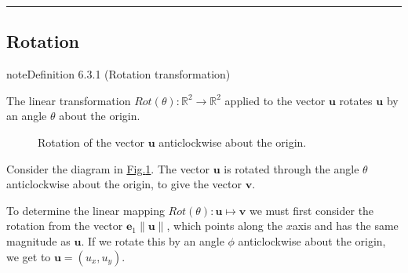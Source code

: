 \documentclass[letterpaper,10pt,english]{jupyterBook}
\let\sphinxpxdimen\pdfpxdimen\else\newdimen\sphinxpxdimen
\begin{document}
\bigskip\hrule\bigskip


\ignorespaces 

\subsection{Rotation}
\label{\detokenize{_pages/6.3_Rotation_reflection_and_translation:rotation}}\label{\detokenize{_pages/6.3_Rotation_reflection_and_translation:index-0}}\label{\detokenize{_pages/6.3_Rotation_reflection_and_translation:rotation-section}}\label{_pages/6.3_Rotation_reflection_and_translation:rotation-definition}
\begin{sphinxadmonition}{note}{Definition 6.3.1 (Rotation transformation)}



\sphinxAtStartPar
The linear transformation \(Rot(\theta): \mathbb{R}^2 \to \mathbb{R}^2\) applied to the vector \(\mathbf{u}\) rotates \(\mathbf{u}\) by an angle \(\theta\)  about the origin.
\end{sphinxadmonition}

\begin{figure}[htbp]
\centering
\capstart

\noindent\sphinxincludegraphics[width=300\sphinxpxdimen]{{6_rotation}.svg}
\caption{Rotation of the vector \(\mathbf{u}\) anti\sphinxhyphen{}clockwise about the origin.}\label{\detokenize{_pages/6.3_Rotation_reflection_and_translation:rotation-figure}}\end{figure}

\sphinxAtStartPar
Consider the diagram in \hyperref[\detokenize{_pages/6.3_Rotation_reflection_and_translation:rotation-figure}]{Fig.\@ \ref{\detokenize{_pages/6.3_Rotation_reflection_and_translation:rotation-figure}}}. The vector \(\mathbf{u}\) is rotated through the angle \(\theta\) anti\sphinxhyphen{}clockwise about the origin, to give the vector \(\mathbf{v}\).

\sphinxAtStartPar
To determine the linear mapping \(Rot(\theta): \mathbf{u} \mapsto \mathbf{v}\) we must first consider the rotation from the vector \(\mathbf{e}_1\|\mathbf{u}\|\), which points along the \(x\)\sphinxhyphen{}axis and has the same magnitude as \(\mathbf{u}\). If we rotate this by an angle \(\phi\) anti\sphinxhyphen{}clockwise about the origin, we get to \(\mathbf{u}=(u_x, u_y)\).
\end{document}
